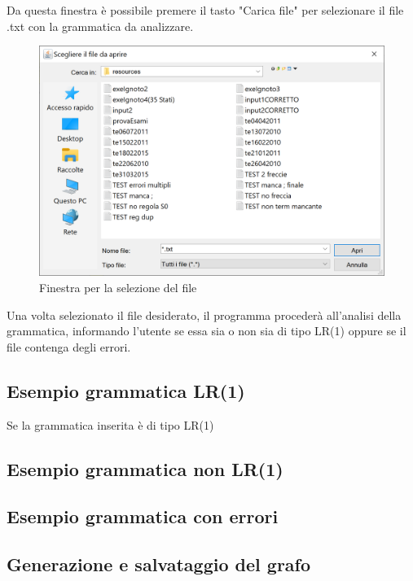 \documentclass[12pt]{article}
\begin{document}
Da questa finestra è possibile premere il tasto "Carica file" per selezionare il file .txt con la grammatica da analizzare.
\begin{figure}[h!]
\centering
\includegraphics[scale=0.6]{immagini/SelezioneLinguaggio.png}
\caption{Finestra per la selezione del file}
\end{figure}

Una volta selezionato il file desiderato, il programma procederà all'analisi della grammatica, informando l'utente se essa sia o non sia di tipo LR(1) oppure se il file contenga degli errori.

\subsection{Esempio grammatica LR(1)}
Se la grammatica inserita è di tipo LR(1)

\subsection{Esempio grammatica non LR(1)}


\subsection{Esempio grammatica con errori}


\subsection{Generazione e salvataggio del grafo}
\end{document}
